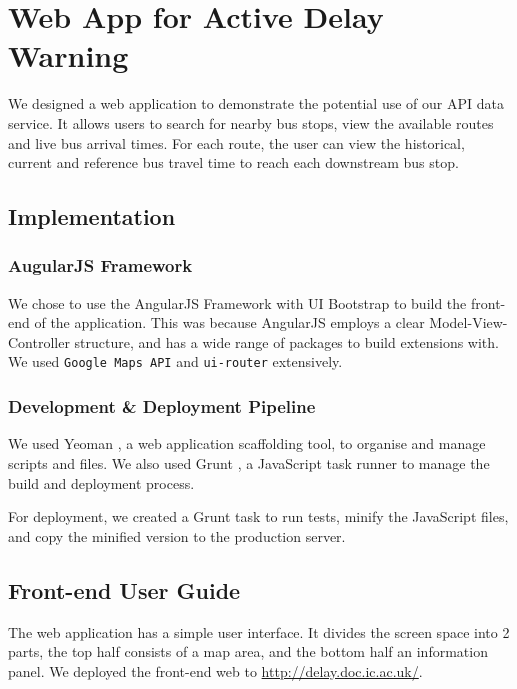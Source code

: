 \chapter{Web App for Active Delay Warning}
\label{ch:mobile_app}

\par We designed a web application to demonstrate the potential use of our API data service. It allows users to search for nearby bus stops, view the available routes and live bus arrival times. For each route, the user can view the historical, current and reference bus travel time to reach each downstream bus stop.

\section{Implementation}
\subsection{AugularJS Framework}
\par We chose to use the AngularJS Framework \cite{angularjs} with UI Bootstrap \cite{bootstrap} to build the front-end of the application. This was because AngularJS employs a clear Model-View-Controller structure, and has a wide range of packages to build extensions with. We used \texttt{Google Maps API} \cite{angular_google_maps} and \texttt{ui-router} \cite{ui_router} extensively.

\subsection{Development \& Deployment Pipeline}
\par We used Yeoman \cite{yeoman}, a web application scaffolding tool, to organise and manage scripts and files. We also used Grunt \cite{grunt}, a JavaScript task runner to manage the build and deployment process.

\par For deployment, we created a Grunt task to run tests, minify the JavaScript files, and copy the minified version to the production server.

\section{Front-end User Guide}
\par The web application has a simple user interface. It divides the screen space into 2 parts, the top half consists of a map area, and the bottom half an information panel. We deployed the front-end web to \url{http://delay.doc.ic.ac.uk/}.

